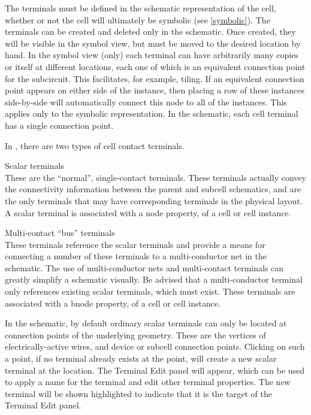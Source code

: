 The terminals must be defined in the schematic representation of the
cell, whether or not the cell will ultimately be symbolic (see
\ref{symbolic}).  The terminals can be created and deleted only in the
schematic.  Once created, they will be visible in the symbol view, but
must be moved to the desired location by hand.  In the symbol view
(only) each terminal can have arbitrarily many copies or itself at
different locations, each one of which is an equivalent connection
point for the subcircuit.  This facilitates, for example, tiling.  If
an equivalent connection point appears on either side of the instance,
then placing a row of these instances side-by-side will automatically
connect this node to all of the instances.  This applies only to the
symbolic representation.  In the schematic, each cell terminal has a
single connection point.

In {\Xic}, there are two types of cell contact terminals.

\begin{description}
\item{Scalar terminals}\\
These are the ``normal'', single-contact terminals.  These terminals
actually convey the connectivity information between the parent and
subcell schematics, and are the only terminals that may have
corresponding terminals in the physical layout.  A scalar terminal is
associated with a {\et node} property, of a cell or cell instance.

\item{Multi-contact ``bus'' terminals}\\
These terminals reference the scalar terminals and provide a means for
connecting a number of these terminals to a multi-conductor net in the
schematic.  The use of multi-conductor nets and multi-contact
terminals can greatly simplify a schematic visually.  Be advised that
a multi-conductor terminal only references existing scalar terminals,
which must exist.  These terminals are associated with a {\et bnode}
property, of a cell or cell instance.
\end{description}

In the schematic, by default ordinary scalar terminals can only be
located at connection points of the underlying geometry.  These are
the vertices of electrically-active wires, and device or subcell
connection points.  Clicking on such a point, if no terminal already
exists at the point, will create a new scalar terminal at the
location.  The {\cb Terminal Edit} panel will appear, which can be
used to apply a name for the terminal and edit other terminal
properties.  The new terminal will be shown highlighted to indicate
that it is the target of the {\cb Terminal Edit} panel.


